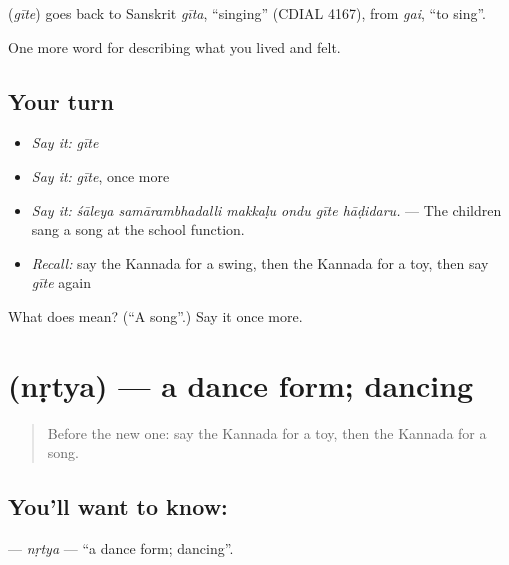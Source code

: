 \begin{cousinweb}
\textbf{} (\emph{gīte}) goes back to Sanskrit \emph{gīta}, \textquotedblleft{}singing\textquotedblright{} (CDIAL 4167), from \emph{gai}, \textquotedblleft{}to sing\textquotedblright{}.
\end{cousinweb}

\begin{grammarlens}[title={What you've built}]
One more word for describing what you lived and felt.
\end{grammarlens}

\subsection*{Your turn}
\begin{itemize}
\raggedright
  \item \emph{Say it:} \emph{gīte}
  \item \emph{Say it:} \emph{gīte}, once more
  \item \emph{Say it:} \emph{śāleya samārambhadalli makkaḷu ondu gīte hāḍidaru.} — The children sang a song at the school function.
  \item \emph{Recall:} say the Kannada for a swing, then the Kannada for a toy, then say \emph{gīte} again
\end{itemize}

\begin{tcolorbox}[breakable,colback=teal!4,colframe=teal!35!black,title={Before you move on}]
What does  mean? (\textquotedblleft{}A song\textquotedblright{}.) Say it once more.
\end{tcolorbox}
\section[\texorpdfstring{\kn{ನೃತ್ಯ} (nṛtya)}{ನೃತ್ಯ (nṛtya)}]{ (nṛtya) — a dance form; dancing}

\label{lesson:KA-C532-nrtya}



\begin{quote}
Before the new one: say the Kannada for a toy, then the Kannada for a song.
\end{quote}

\subsection*{You'll want to know: }
\textbf{} — \emph{nṛtya} — \textquotedblleft{}a dance form; dancing\textquotedblright{}.

